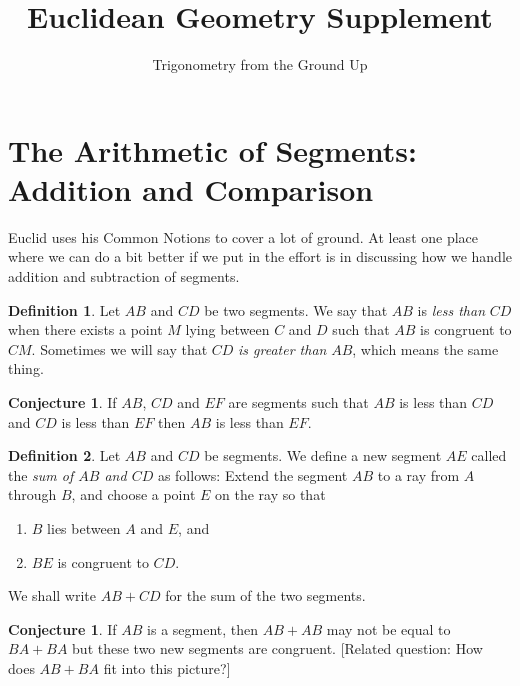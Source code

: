 \documentclass{amsart}
\theoremstyle{definition}
\newtheorem{conjecture}[problem]{Conjecture}
\newtheorem*{definition}{Definition}
\begin{document}
\title{Euclidean Geometry Supplement}
\author[Euclidean Geometry]{Trigonometry from the Ground Up}

\maketitle

\setcounter{section}{0}
\renewcommand{\thesection}{\Alph{section}}
\section{The Arithmetic of Segments: Addition and Comparison}

Euclid uses his Common Notions to cover a lot of ground. At least one place where we can do a bit better if we put in the effort is in discussing how we handle addition and subtraction of segments.

\begin{definition} Let $AB$ and $CD$ be two segments. We say that $AB$ is \emph{less than} $CD$ when there exists a point $M$ lying between $C$ and $D$ such that $AB$ is congruent to $CM$. Sometimes we will say that $CD$ \emph{is greater than} $AB$, which means the same thing.
\end{definition}

\begin{conjecture} If $AB$, $CD$ and $EF$ are segments such that $AB$ is less than $CD$ and $CD$ is less than $EF$ then $AB$ is less than $EF$.
\end{conjecture}

\begin{definition}
Let $AB$ and $CD$ be segments. We define a new segment $AE$ called the \emph{sum of $AB$ and $CD$} as follows: Extend the segment $AB$ to a ray from $A$ through $B$, and choose a point $E$ on the ray so that 
\begin{enumerate}
\item $B$ lies between $A$ and $E$, and 
\item $BE$ is congruent to $CD$.\end{enumerate} 
We shall write $AB+CD$ for the sum of the two segments.
\end{definition}

\begin{conjecture} If $AB$ is a segment, then $AB+AB$ may not be equal to $BA+BA$ but these two new segments are congruent. [Related question: How does $AB+BA$ fit into this picture?]
\end{conjecture}
\end{document}
